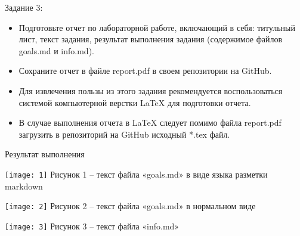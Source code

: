 \documentclass[12pt]{article}
\begin{document}
Задание 3:
\begin{itemize}
\item Подготовьте отчет по лабораторной работе, включающий в себя: титульный лист, текст задания, результат выполнения задания (содержимое файлов goals.md и info.md). 
\item Сохраните отчет в файле report.pdf в своем репозитории на GitHub.
\item Для извлечения пользы из этого задания рекомендуется воспользоваться системой компьютерной верстки LaTeX для подготовки отчета. 
\item В случае выполнения отчета в LaTeX следует помимо файла report.pdf загрузить в репозиторий на GitHub исходный *.tex файл.
\end{itemize}
\begin{Center}
Результат выполнения

\texttt{[image: 1]}
Рисунок 1 – текст файла «goals.md» в виде языка разметки markdown

\texttt{[image: 2]}
Рисунок 2 – текст файла «goals.md» в нормальном виде

\texttt{[image: 3]}
Рисунок 3 – текст файла «info.md»
\end{Center}
\end{document}
